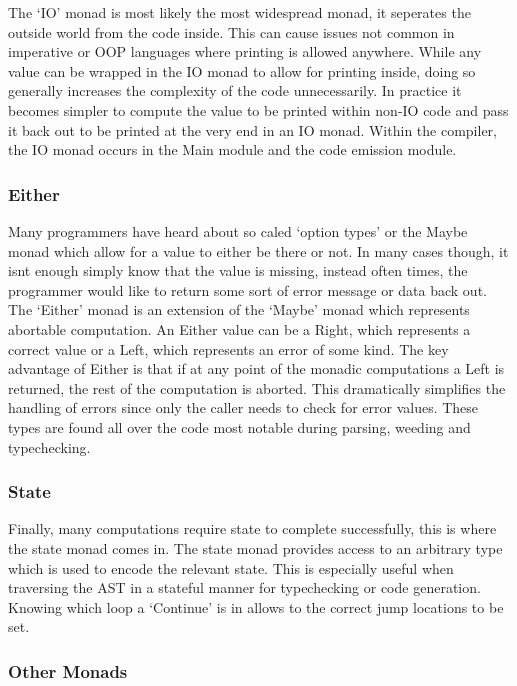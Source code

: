 \documentclass[11pt]{article}
\begin{document}
The `IO' monad is most likely the most widespread monad, it seperates the outside world from the code inside. This can cause issues not common in imperative or OOP languages where printing is allowed anywhere. While any value can be wrapped in the IO monad to allow for printing inside, doing so generally increases the complexity of the code unnecessarily. In practice it becomes simpler to compute the value to be printed within non-IO code and pass it back out to be printed at the very end in an IO monad. Within the compiler, the IO monad occurs in the Main module and the code emission module. 

\subsubsection{Either}

Many programmers have heard about so caled `option types' or the Maybe monad which allow for a value to either be there or not. In many cases though, it isnt enough simply know that the value is missing, instead often times, the programmer would like to return some sort of error message or data back out. The `Either' monad is an extension of the `Maybe' monad which represents abortable computation. An Either value can be a Right, which represents a correct value or a Left, which represents an error of some kind. The key advantage of Either is that if at any point of the monadic computations a Left is returned, the rest of the computation is aborted. This dramatically simplifies the handling of errors since only the caller needs to check for error values. These types are found all over the code most notable during parsing, weeding and typechecking. 

\subsubsection{State}

Finally, many computations require state to complete successfully, this is where the state monad comes in. The state monad provides access to an arbitrary type which is used to encode the relevant state. This is especially useful when traversing the AST in a stateful manner for typechecking or code generation. Knowing which loop a `Continue' is in allows to the correct jump locations to be set. 

\subsubsection{Other Monads}
\end{document}
